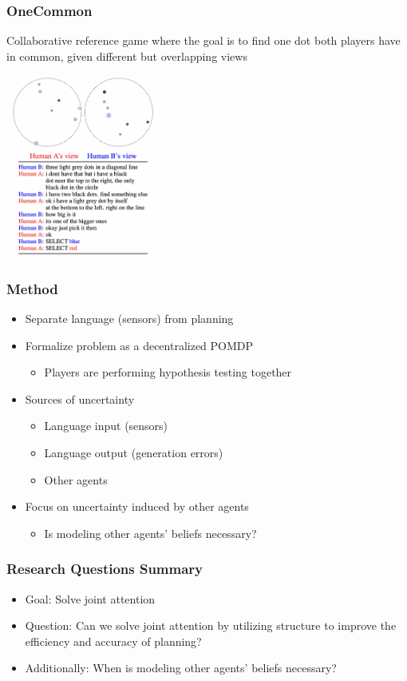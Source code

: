 \documentclass{beamer}
\begin{document}
\begin{frame}
\frametitle{OneCommon}
Collaborative reference game where the goal is to find one dot
both players have in common,
given different but overlapping views
\begin{center}
\includegraphics[width=2in]{img/oc.png}
\end{center}
\end{frame}

\begin{frame}
\frametitle{Method}
\begin{itemize}
\item Separate language (sensors) from planning
\item Formalize problem as a decentralized POMDP
    \begin{itemize}
    \item Players are performing hypothesis testing together
    \end{itemize}
\item Sources of uncertainty
    \begin{itemize}
    \item Language input (sensors)
    \item Language output (generation errors)
    \item Other agents
    \end{itemize}
\item Focus on uncertainty induced by other agents
    \begin{itemize}
    \item Is modeling other agents' beliefs necessary?
    \end{itemize}
\end{itemize}
\end{frame}

\begin{frame}
\frametitle{Research Questions Summary}
\begin{itemize}
\item Goal: Solve joint attention
\item Question: Can we solve joint attention by utilizing structure to improve the
    efficiency and accuracy of planning?
\item Additionally: When is modeling other agents' beliefs necessary?
\end{itemize}
\end{frame}
\end{document}
